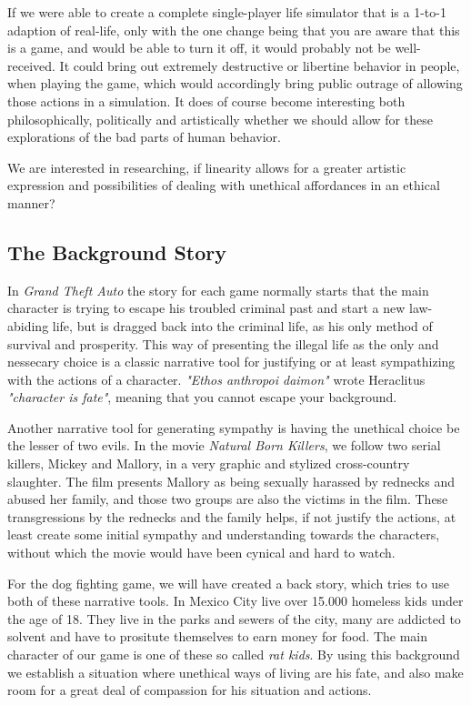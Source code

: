 If we were able to create a complete single-player life simulator that is a 1-to-1 adaption of real-life, only with the one change being that you are aware that this is a game, and would be able to turn it off, it would probably not be well-received. It could bring out extremely destructive or libertine behavior in people, when playing the game, which would accordingly bring public outrage of allowing those actions in a simulation. It does of course become interesting both philosophically, politically and artistically whether we should allow for these explorations of the bad parts of human behavior.\

We are interested in researching, if linearity allows for a greater artistic expression and possibilities of dealing with unethical affordances in an ethical manner? \

\subsection{The Background Story}
In \textit{Grand Theft Auto} the story for each game normally starts that the main character is trying to escape his troubled criminal past and start a new law-abiding life, but is dragged back into the criminal life, as his only method of survival and prosperity. This way of presenting the illegal life as the only and nessecary choice is a classic narrative tool for justifying or at least sympathizing with the actions of a character. \textit{"Ethos anthropoi daimon"} wrote Heraclitus \- \textit{"character is fate"}, meaning that you cannot escape your background.\ 

Another narrative tool for generating sympathy is having the unethical choice be the lesser of two evils. In the movie \textit{Natural Born Killers}\cite{stone1994natural}, we follow two serial killers, Mickey and Mallory, in a very graphic and stylized cross-country slaughter. The film presents Mallory as being sexually harassed by rednecks and abused her family, and those two groups are also the victims in the film. These transgressions by the rednecks and the family helps, if not justify the actions, at least create some initial sympathy and understanding towards the characters, without which the movie would have been cynical and hard to watch. \

For the dog fighting game, we will have created a back story, which tries to use both of these narrative tools. In Mexico City live over 15.000 homeless kids under the age of 18. They live in the parks and sewers of the city, many are addicted to solvent and have to prositute themselves to earn money for food.\cite{baverstock} The main character of our game is one of these so called \textit{rat kids}. By using this background we establish a situation where unethical ways of living are his fate, and also make room for a great deal of compassion for his situation and actions. \

